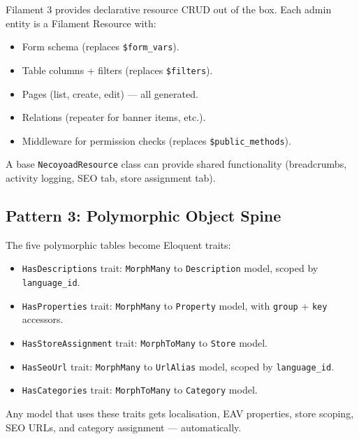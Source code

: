 \documentclass[11pt,a4paper]{article}
\begin{document}
\begin{preservebox}
Filament 3 provides declarative resource CRUD out of the box. Each
admin entity is a Filament Resource with:
\begin{itemize}[leftmargin=1.6em,itemsep=2pt]
  \item Form schema (replaces \texttt{\$form\_vars}).
  \item Table columns + filters (replaces \texttt{\$filters}).
  \item Pages (list, create, edit) --- all generated.
  \item Relations (repeater for banner items, etc.).
  \item Middleware for permission checks (replaces
        \texttt{\$public\_methods}).
\end{itemize}
A base \texttt{NecoyoadResource} class can provide shared
functionality (breadcrumbs, activity logging, SEO tab, store
assignment tab).
\end{preservebox}

\subsection{Pattern 3: Polymorphic Object Spine}

\begin{preservebox}
The five polymorphic tables become Eloquent traits:
\begin{itemize}[leftmargin=1.6em,itemsep=2pt]
  \item \texttt{HasDescriptions} trait: \texttt{MorphMany} to
        \texttt{Description} model, scoped by \texttt{language\_id}.
  \item \texttt{HasProperties} trait: \texttt{MorphMany} to
        \texttt{Property} model, with \texttt{group} + \texttt{key}
        accessors.
  \item \texttt{HasStoreAssignment} trait: \texttt{MorphToMany} to
        \texttt{Store} model.
  \item \texttt{HasSeoUrl} trait: \texttt{MorphMany} to
        \texttt{UrlAlias} model, scoped by \texttt{language\_id}.
  \item \texttt{HasCategories} trait: \texttt{MorphToMany} to
        \texttt{Category} model.
\end{itemize}
Any model that uses these traits gets localisation, EAV properties,
store scoping, SEO URLs, and category assignment --- automatically.
\end{preservebox}
\end{document}
